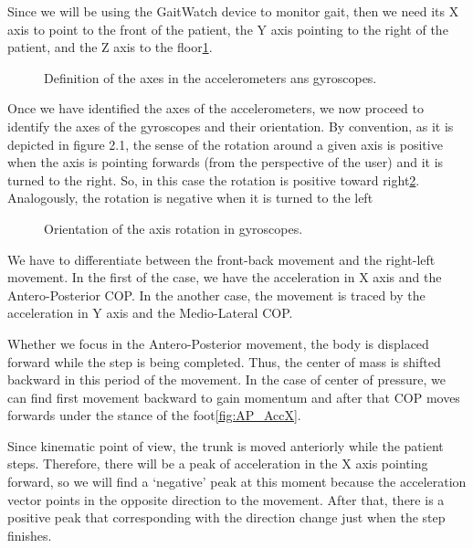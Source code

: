 Since we will be using the GaitWatch device to monitor gait, then we need its X axis to point to the front of the patient, the Y axis pointing to the right  of the patient, and the Z axis to the floor\ref{fig:axesGW}\cite{OlivaresBotzel2013}.

\begin{figure}[H]
	\centering
	\caption{Definition of the axes in the accelerometers ans gyroscopes.}
	\label{fig:axesGW}
\end{figure}

Once we have identified the axes of the accelerometers, we now proceed to identify the axes of the gyroscopes and their orientation. By convention, as it is depicted in figure 2.1, the sense of the rotation around a given axis is positive when the axis is pointing forwards (from the perspective of the user) and it is turned to the right. So, in this case the rotation is positive toward right\ref{fig:axesGWGyro}. Analogously, the rotation is negative when it is turned to the left  \cite{OlivaresBotzel2013}

\begin{figure}[H]
	\centering
	\caption{Orientation of the axis rotation in gyroscopes.}
	\label{fig:axesGWGyro}
\end{figure}


We have to differentiate between the front-back movement and the right-left movement. In the first of the case, we have the acceleration in X axis and the Antero-Posterior COP. In the another case, the movement is traced by the acceleration in Y axis and the Medio-Lateral  COP.

Whether we focus in the Antero-Posterior movement, the body is displaced forward while the step is being completed. Thus, the center of mass is shifted backward in this period of the movement. In the case of center of pressure, we can find first  movement backward to gain momentum and after that  COP moves forwards under the stance of the foot\ref{fig:AP_AccX}.

Since kinematic point of view, the trunk is moved anteriorly while the patient steps. Therefore, there will be a peak of acceleration in the X axis pointing forward, so we will find a ‘negative’ peak at this moment because the acceleration vector points in the opposite direction to the movement. After that, there is a positive peak that corresponding with the direction change just when the step finishes. 

